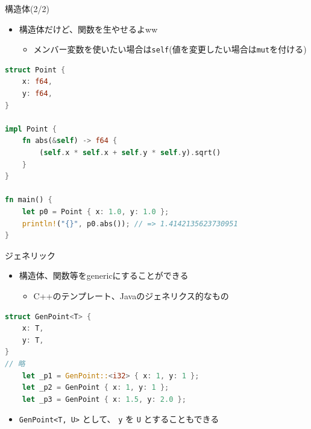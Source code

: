 \documentclass[cjk,dvipdfmx,10pt,compress,fragile%
hyperref={bookmarks=true,bookmarksnumbered=true,bookmarksopen=false,%
colorlinks=false,%
pdftitle={第 134 回 関西 Debian 勉強会},%
pdfauthor={小林},%
pdfsubject={資料},%
}]{beamer}
\begin{document}
\begin{frame}[t,fragile]{構造体(2/2)}
\begin{itemize}
 \item 構造体だけど、関数を生やせるよww
       \begin{itemize}
	\item メンバー変数を使いたい場合は\texttt{self}(値を変更したい場合は\texttt{mut}を付ける)
       \end{itemize}
\end{itemize}
\begin{lstlisting}[language=Rust,style=boxed,style=colouredRust,basicstyle=\small\tt,lineskip=-2pt]
struct Point {
    x: f64,
    y: f64,
}

impl Point {
    fn abs(&self) -> f64 {
        (self.x * self.x + self.y * self.y).sqrt()
    }
}

fn main() {
    let p0 = Point { x: 1.0, y: 1.0 };
    println!("{}", p0.abs()); // => 1.4142135623730951
}\end{lstlisting}
\end{frame}

\begin{frame}[t,fragile]{ジェネリック}
\begin{itemize}
 \item 構造体、関数等をgenericにすることができる
       \begin{itemize}
	\item C++のテンプレート、Javaのジェネリクス的なもの
       \end{itemize}
\end{itemize}
\begin{lstlisting}[language=Rust,style=boxed,style=colouredRust,basicstyle=\small\tt,lineskip=-2pt]
struct GenPoint<T> {
    x: T,
    y: T,
}
// 略
    let _p1 = GenPoint::<i32> { x: 1, y: 1 };
    let _p2 = GenPoint { x: 1, y: 1 };
    let _p3 = GenPoint { x: 1.5, y: 2.0 };
\end{lstlisting}
\begin{itemize}
 \item \verb|GenPoint<T, U>| として、 \texttt{y} を \texttt{U} とすることもできる
\end{itemize}
\end{frame}
\end{document}
